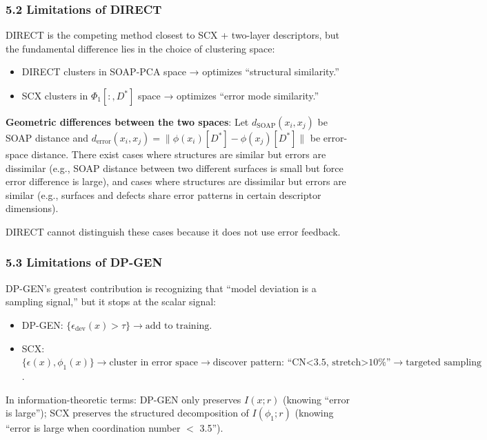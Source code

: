 \documentclass[
  12pt,
]{article}
\providecommand{\tightlist}{%
  \setlength{\itemsep}{0pt}\setlength{\parskip}{0pt}}
\begin{document}
\subsubsection{5.2 Limitations of DIRECT}\label{limitations-of-direct}

DIRECT is the competing method closest to SCX + two-layer descriptors, but the fundamental difference lies in the choice of clustering space:

\begin{itemize}
\tightlist
\item
  DIRECT clusters in SOAP-PCA space → optimizes ``structural similarity.''
\item
  SCX clusters in $\Phi_1[:, D^*]$ space → optimizes ``error mode similarity.''
\end{itemize}

\textbf{Geometric differences between the two spaces}: Let $d_{\text{SOAP}}(x_i, x_j)$ be SOAP distance and $d_{\text{error}}(x_i, x_j) = \|\phi(x_i)[D^*] - \phi(x_j)[D^*]\|$ be error-space distance. There exist cases where structures are similar but errors are dissimilar (e.g., SOAP distance between two different surfaces is small but force error difference is large), and cases where structures are dissimilar but errors are similar (e.g., surfaces and defects share error patterns in certain descriptor dimensions).

DIRECT cannot distinguish these cases because it does not use error feedback.

\subsubsection{5.3 Limitations of DP-GEN}\label{limitations-of-dp-gen}

DP-GEN's greatest contribution is recognizing that ``model deviation is a sampling signal,'' but it stops at the scalar signal:

\begin{itemize}
\tightlist
\item
  DP-GEN: $\{\epsilon_{\text{dev}}(x) > \tau\} \rightarrow \text{add to training}$.
\item
  SCX: $\{\epsilon(x), \phi_1(x)\} \rightarrow \text{cluster in error space} \rightarrow \text{discover pattern: ``CN<3.5, stretch>10\%''} \rightarrow \text{targeted sampling}$.
\end{itemize}

In information-theoretic terms: DP-GEN only preserves $I(x; r)$ (knowing ``error is large''); SCX preserves the structured decomposition of $I(\phi_1; r)$ (knowing ``error is large when coordination number $<$ 3.5'').
\end{document}
